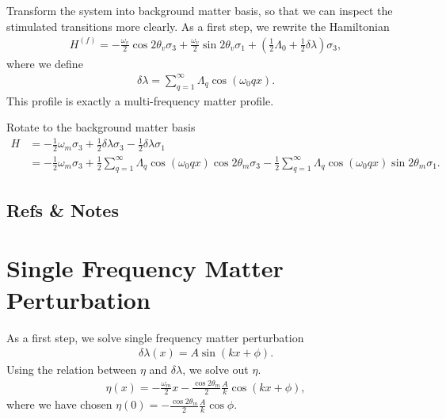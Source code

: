 \documentclass[letterpaper,12pt,english]{sphinxmanual}
\begin{document}
Transform the system into background matter basis, so that we can inspect the stimulated transitions more clearly. As a first step, we rewrite the Hamiltonian
\begin{equation*}
\begin{split}H^{(f)} = -\frac{\omega_v}{2} \cos 2\theta_v \sigma_3 + \frac{\omega_v}{2} \sin 2\theta_v \sigma_1  + \left( \frac{1}{2}\Lambda_0  + \frac{1}{2}  \delta \lambda \right) \sigma_3,\end{split}
\end{equation*}
where we define
\begin{equation*}
\begin{split}\delta \lambda = \sum_{q=1}^{\infty} \Lambda_q \cos\left( \omega_0 q x \right).\end{split}
\end{equation*}
This profile is exactly a multi-frequency matter profile.

Rotate to the background matter basis
\begin{equation*}
\begin{split}H &= - \frac{1}{2}\omega_m \sigma_3 + \frac{1}{2} \delta\lambda \sigma_3 - \frac{1}{2} \delta \lambda \sigma_1 \\
&= - \frac{1}{2}\omega_m \sigma_3  + \frac{1}{2} \sum_{q=1}^{\infty} \Lambda_q \cos\left( \omega_0 q x \right) \cos 2\theta_m \sigma_3 - \frac{1}{2} \sum_{q=1}^{\infty} \Lambda_q \cos\left( \omega_0 q x \right) \sin 2\theta_m \sigma_1.\end{split}
\end{equation*}

\subsection{Refs \& Notes}
\label{\detokenize{matter-stimulated/parametric-resonance-revisted:refs-notes}}

\section{Single Frequency Matter Perturbation}
\label{\detokenize{matter-stimulated/single-frequency::doc}}\label{\detokenize{matter-stimulated/single-frequency:single-frequency-matter-perturbation}}
As a first step, we solve single frequency matter perturbation
\begin{equation*}
\begin{split}\delta \lambda(x)  = A \sin (k x + \phi).\end{split}
\end{equation*}
Using the relation between \(\eta\) and \(\delta\lambda\), we solve out \(\eta\).
\begin{equation*}
\begin{split}\eta(x) = - \frac{\omega_m}{2}x - \frac{\cos 2\theta_m}{2} \frac{A}{k} \cos (k x + \phi),\end{split}
\end{equation*}
where we have chosen \(\eta(0)=-\frac{\cos 2\theta_m}{2}\frac{A}{k}\cos\phi\).
\end{document}
